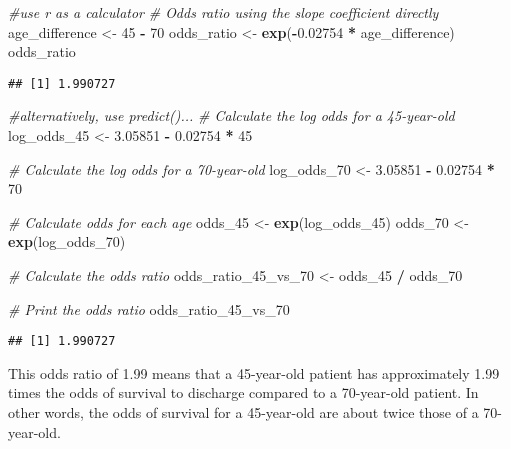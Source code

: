 \documentclass[
]{article}
\newenvironment{Shaded}{\begin{snugshade}}{\end{snugshade}}
\newcommand{\CommentTok}[1]{\textcolor[rgb]{0.56,0.35,0.01}{\textit{#1}}}
\newcommand{\DecValTok}[1]{\textcolor[rgb]{0.00,0.00,0.81}{#1}}
\newcommand{\FloatTok}[1]{\textcolor[rgb]{0.00,0.00,0.81}{#1}}
\newcommand{\FunctionTok}[1]{\textcolor[rgb]{0.13,0.29,0.53}{\textbf{#1}}}
\newcommand{\NormalTok}[1]{#1}
\newcommand{\OtherTok}[1]{\textcolor[rgb]{0.56,0.35,0.01}{#1}}
\newcommand{\SpecialCharTok}[1]{\textcolor[rgb]{0.81,0.36,0.00}{\textbf{#1}}}
\begin{document}
\begin{Shaded}
\begin{Highlighting}[]
\CommentTok{\#use r as a calculator}
\CommentTok{\# Odds ratio using the slope coefficient directly}
\NormalTok{age\_difference }\OtherTok{\textless{}{-}} \DecValTok{45} \SpecialCharTok{{-}} \DecValTok{70}
\NormalTok{odds\_ratio }\OtherTok{\textless{}{-}} \FunctionTok{exp}\NormalTok{(}\SpecialCharTok{{-}}\FloatTok{0.02754} \SpecialCharTok{*}\NormalTok{ age\_difference)}
\NormalTok{odds\_ratio}
\end{Highlighting}
\end{Shaded}

\begin{verbatim}
## [1] 1.990727
\end{verbatim}

\begin{Shaded}
\begin{Highlighting}[]
\CommentTok{\#alternatively, use predict()...}
\CommentTok{\# Calculate the log odds for a 45{-}year{-}old}
\NormalTok{log\_odds\_45 }\OtherTok{\textless{}{-}} \FloatTok{3.05851} \SpecialCharTok{{-}} \FloatTok{0.02754} \SpecialCharTok{*} \DecValTok{45}

\CommentTok{\# Calculate the log odds for a 70{-}year{-}old}
\NormalTok{log\_odds\_70 }\OtherTok{\textless{}{-}} \FloatTok{3.05851} \SpecialCharTok{{-}} \FloatTok{0.02754} \SpecialCharTok{*} \DecValTok{70}

\CommentTok{\# Calculate odds for each age}
\NormalTok{odds\_45 }\OtherTok{\textless{}{-}} \FunctionTok{exp}\NormalTok{(log\_odds\_45)}
\NormalTok{odds\_70 }\OtherTok{\textless{}{-}} \FunctionTok{exp}\NormalTok{(log\_odds\_70)}

\CommentTok{\# Calculate the odds ratio}
\NormalTok{odds\_ratio\_45\_vs\_70 }\OtherTok{\textless{}{-}}\NormalTok{ odds\_45 }\SpecialCharTok{/}\NormalTok{ odds\_70}

\CommentTok{\# Print the odds ratio}
\NormalTok{odds\_ratio\_45\_vs\_70}
\end{Highlighting}
\end{Shaded}

\begin{verbatim}
## [1] 1.990727
\end{verbatim}

This odds ratio of 1.99 means that a 45-year-old patient has
approximately 1.99 times the odds of survival to discharge compared to a
70-year-old patient. In other words, the odds of survival for a
45-year-old are about twice those of a 70-year-old.
\end{document}
